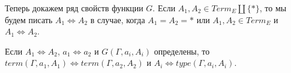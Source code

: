 \documentclass{amsart}
\theoremstyle{definition}
\theoremstyle{remark}
\newcommand{\red}{\Rightarrow}
\newcommand{\deq}{\Leftrightarrow}
\renewcommand{\ll}{\llbracket}
\newcommand{\rr}{\rrbracket}
\numberwithin{figure}{section}
\begin{document}
Теперь докажем ряд свойств функции $G$.
Если $A_1, A_2 \in Term_E \amalg \{ * \}$, то мы будем писать $A_1 \deq A_2$ в случае, когда $A_1 = A_2 = *$ или $A_1, A_2 \in Term_E$ и $A_1 \deq A_2$.

\begin{prop}
Если $A_1 \deq A_2$, $a_1 \deq a_2$ и $G(\Gamma, a_i, A_i)$ определены, то $term(\Gamma, a_1, A_1) \deq term(\Gamma, a_2, A_2)$ и $A_i \deq type(\Gamma, a_i, A_i)$.
\end{prop}

\begin{comment}
Чтобы определить функтор в обратную сторону, нам понадобится вспомогательная конструкция.
Мы определим следующие отношения:
\begin{itemize}
\item $\ll - \vdash \rr = - \vdash$ на множестве $Ctx_I \times Ctx_E$.
\item $\ll - \vdash - \rr = - \vdash -$ на множестве $Ctx_I \times Term_I \times Ctx_E \times Term_E$.
\item $\ll - \vdash - : - \rr = - \vdash - \Uparrow -$ на множестве $Ctx_I \times Term_I \times Term_I \times Ctx_E \times Term_E \times Term_E$.
\item $\ll - \vdash - : - \rr = - \vdash - \Downarrow -$ на множестве $Ctx_I \times Term_I \times Term_I \times Ctx_E \times Term_E \times Term_E$.
\end{itemize}

Отношения определяются индуктивным образом:

\medskip
\begin{center}
\AxiomC{}
\UnaryInfC{$\ll \vdash \rr = \vdash$}
\DisplayProof
\quad
\AxiomC{$\ll \Gamma \vdash A \rr = \Gamma' \vdash A'$}
\RightLabel{, $x \notin \Gamma$}
\UnaryInfC{$\ll \Gamma, x : A \vdash \rr = \Gamma', x : A' \vdash$}
\DisplayProof
\end{center}

\medskip
\begin{center}
\AxiomC{$\ll \Gamma \vdash \rr = \Gamma' \vdash$}
\RightLabel{, $x : A \in \Gamma$, $x : A' \in \Gamma'$}
\UnaryInfC{$\ll \Gamma \vdash x : A \rr = \Gamma' \vdash x \Uparrow A'$}
\DisplayProof
\end{center}

\medskip
\begin{center}
\AxiomC{$\ll \Gamma \vdash a : A \rr = \Gamma' \vdash a' \Uparrow A'$}
\AxiomC{$\ll \Gamma \vdash B \rr = \Gamma' \vdash B'$}
\RightLabel{, $A \red_h^* B$}
\BinaryInfC{$\ll \Gamma \vdash a : B \rr = \Gamma' \vdash a' \Uparrow A'$}
\DisplayProof
\end{center}


\end{comment}
\end{document}
